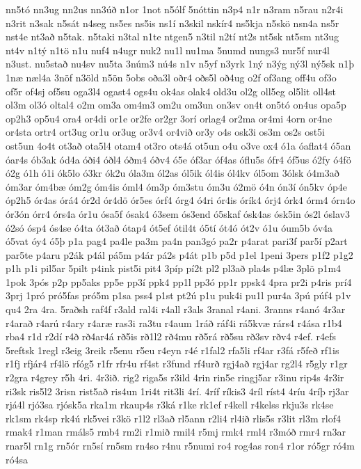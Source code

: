 {nn5tó
nn3ug
nn2us
nn3úð
n1or
1not
n5ólf
5nóttin
n3p4
n1r
n3ram
n5rau
n2r4i
n3rit
n3sak
n5sát
n4seg
ns5es
ns5is
ns1í
n3skil
nskír4
ns5kja
n5skö
nsn4a
ns5r
nst4e
nt3að
n5tak.
n5taki
n3tal
n1te
ntgen5
n3til
n2tí
nt2s
nt5sk
nt5sm
nt3ug
nt4v
n1tý
n1tö
n1u
nuf4
n4ugr
nuk2
nu1l
nu1ma
5numd
nungs3
nur5f
nur4l
n3ust.
nu5stað
nu4sv
nu5ta
3núm3
nú4s
n1v
n5yf
n3yrk
1ný
n3ýg
ný3l
ný5sk
n1þ
1næ
næl4a
3nöf
n3öld
n5ön
5obs
oða3l
oðr4
oðs5l
oð4ug
o2f
of3ang
off4u
of3o
of5r
of4sj
of5su
oga3l4
ogast4
ogs4u
ok4as
olak4
old3u
ol2g
oll5eg
ol5lit
oll4st
ol3m
ol3ó
oltal4
o2m
om3a
om4m3
om2u
om3un
on3sv
on4t
on5tó
on4us
opa5p
op2h3
op5u4
ora4
or4di
or1e
or2fe
or2gr
3orí
orlag4
or2ma
or4mi
4orn
or4ne
or4sta
ortr4
ort3ug
or1u
or3ug
or3v4
or4við
or3y
o4s
osk3i
os3m
os2s
ost5i
ost5un
4o4t
ot3að
ota5l4
otam4
ot3ro
ots4á
ot5un
o4u
o3ve
ox4
ó1a
óaflat4
ó5an
óar4s
ób3ak
ód4a
óði4
óðl4
óðm4
óðv4
ó5e
óf3ar
óf4as
óflu5s
ófr4
óf5us
ó2fy
ó4fö
ó2g
ó1h
ó1i
ók5lo
ó3kr
ók2u
óla3m
ól2as
ól5ik
ól4is
ól4kv
ól5om
3ólsk
ó4m3að
óm3ar
óm4bæ
óm2g
óm4is
óml4
óm3p
óm3stu
óm3u
ó2mö
ó4n
ón3í
ón5kv
óp4e
óp2h5
ór4as
órá4
ór2d
ór4dö
ór5es
órf4
órg4
ó4ri
ór4is
órík4
órj4
órk4
órm4
órn4o
ór3ón
órr4
órs4a
ór1u
ósa5f
ósak4
ó3sem
ós3end
ó5skaf
ósk4as
ósk5in
ós2l
óslav3
ó2só
ósp4
ós4se
ó4ta
ót3að
ótap4
ót5ef
ótil4t
ó5tí
ót4ó
ót2v
ó1u
óum5b
óv4a
ó5vat
óy4
ó5þ
p1a
pag4
pa4le
pa3m
pa4n
pan3gó
pa2r
p4arat
pari3f
par5í
p2art
par5te
p4aru
p2ák
p4ál
pá5m
p4ár
pá2s
p4át
p1b
p5d
p1el
1peni
3pers
p1f2
p1g2
p1h
p1i
pil5ar
5pilt
p4ink
pist5i
pit4
3píp
pí2t
pl2
pl3að
pla4s
p4læ
3plö
p1m4
1pok
3pós
p2p
pp5aks
pp5e
pp3í
ppk4
pp1l
pp3ó
pp1r
ppsk4
4pra
pr2i
p4ris
prí4
3prj
1pró
pró5fas
pró5m
p1sa
pss4
p1st
pt2ú
p1u
puk4i
pu1l
pur4a
3pú
púf4
p1v
qu4
2ra
4ra.
5raðsh
raf4f
r3ald
ral4i
r4all
r3als
3ranal
r4ani.
3ranns
r4anó
4r3ar
r4arað
r4arú
r4ary
r4aræ
ras3i
ra3tu
r4aum
1ráð
ráf4i
rá5kvæ
rárs4
r4ása
r1b4
rba4
r1d
r2dí
r4ð
rð4ar4á
rð5is
rð1l2
rð4mu
rð5rá
rð5su
rð3sv
rðv4
r4ef.
r4efs
5reftsk
1regl
r3eig
3reik
r5enu
r5eu
r4eyn
r4é
r1fal2
rfa5li
rf4ar
r3fá
r5feð
rf1is
r1fj
rfjár4
rf4lö
rfóg5
r1fr
rfr4u
rf4st
r3fund
rf4urð
rgj4að
rgj4ar
rg2l4
r5gly
r1gr
r2gra
r4grey
r5h
4ri.
4r3ið.
rig2
riga5s
r3ild
4rin
rin5e
ringj5ar
r3inu
rip4s
4r3ir
ri3sk
ris5l2
3risn
rist5að
ris4un
1ri4t
rit3li
4rí.
4ríf
ríkis3
4ríl
ríst4
4ríu
4ríþ
rj3ar
rjá4l
rjó3sa
rjósk5a
rka1m
rkaup4s
r3ká
r1ke
rk1ef
r4kell
r4kelss
rkju3s
rk4se
rk1sm
rk4sp
rk4ú
rk5vei
r3kö
r1l2
rl3að
rl5ann
r2li4
rl4ið
rlis5s
r3lit
rl3m
rlof4
rmak4
r1man
rmáls5
rmb4
rm2i
r1mið
rmil4
r5mj
rmk4
rml4
r3móð
rmr4
rn3ar
rnar5l
rn1g
rn5ór
rn5sí
rn5sm
rn4so
r4nu
r5numi
ro4
rog4as
ron4
r1or
ró5gr
ró4m
ró4sa
}
